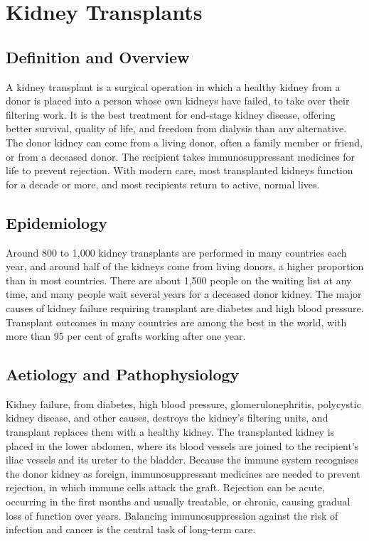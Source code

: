 \chapter{Kidney Transplants}

\section*{Definition and Overview}
A kidney transplant is a surgical operation in which a healthy kidney from a donor is placed into a person whose own kidneys have failed, to take over their filtering work. It is the best treatment for end-stage kidney disease, offering better survival, quality of life, and freedom from dialysis than any alternative. The donor kidney can come from a living donor, often a family member or friend, or from a deceased donor. The recipient takes immunosuppressant medicines for life to prevent rejection. With modern care, most transplanted kidneys function for a decade or more, and most recipients return to active, normal lives.

\section*{Epidemiology}
Around 800 to 1,000 kidney transplants are performed in many countries each year, and around half of the kidneys come from living donors, a higher proportion than in most countries. There are about 1,500 people on the waiting list at any time, and many people wait several years for a deceased donor kidney. The major causes of kidney failure requiring transplant are diabetes and high blood pressure. Transplant outcomes in many countries are among the best in the world, with more than 95 per cent of grafts working after one year.

\section*{Aetiology and Pathophysiology}
Kidney failure, from diabetes, high blood pressure, glomerulonephritis, polycystic kidney disease, and other causes, destroys the kidney's filtering units, and transplant replaces them with a healthy kidney. The transplanted kidney is placed in the lower abdomen, where its blood vessels are joined to the recipient's iliac vessels and its ureter to the bladder. Because the immune system recognises the donor kidney as foreign, immunosuppressant medicines are needed to prevent rejection, in which immune cells attack the graft. Rejection can be acute, occurring in the first months and usually treatable, or chronic, causing gradual loss of function over years. Balancing immunosuppression against the risk of infection and cancer is the central task of long-term care.

